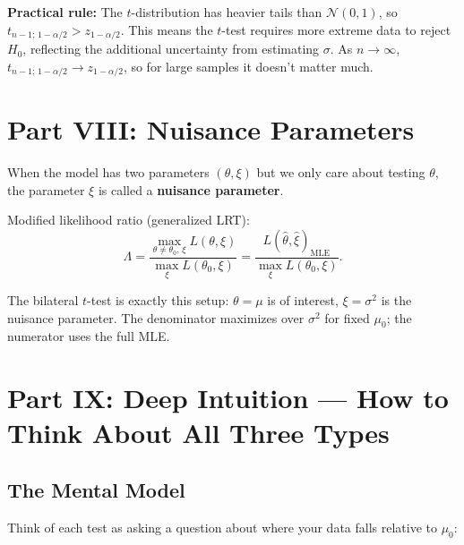 \documentclass[11pt,a4paper]{article}
\begin{document}
\begin{tcolorbox}[infobox]
\textbf{Practical rule:} The $t$-distribution has heavier tails than $\mathcal{N}(0,1)$, so $t_{n-1;\,1-\alpha/2} > z_{1-\alpha/2}$. This means the $t$-test requires more extreme data to reject $H_0$, reflecting the additional uncertainty from estimating $\sigma$. As $n\to\infty$, $t_{n-1;\,1-\alpha/2}\to z_{1-\alpha/2}$, so for large samples it doesn't matter much.
\end{tcolorbox}

\section{Part VIII: Nuisance Parameters}

\begin{tcolorbox}[defbox, title={Nuisance parameter setup (Lecture slide 31)}]
When the model has two parameters $(\theta,\xi)$ but we only care about testing $\theta$, the parameter $\xi$ is called a \textbf{nuisance parameter}.

Modified likelihood ratio (generalized LRT):
\[
  \Lambda = \frac{\max_{\theta\neq\theta_0,\,\xi} L(\theta,\xi)}{\max_\xi L(\theta_0,\xi)} = \frac{L(\hat\theta,\hat\xi)_{\text{MLE}}}{\max_\xi L(\theta_0,\xi)}.
\]
\end{tcolorbox}

The bilateral $t$-test is exactly this setup: $\theta=\mu$ is of interest, $\xi=\sigma^2$ is the nuisance parameter. The denominator maximizes over $\sigma^2$ for fixed $\mu_0$; the numerator uses the full MLE.

\section{Part IX: Deep Intuition --- How to Think About All Three Types}

\subsection{The Mental Model}

Think of each test as asking a question about where your data falls relative to $\mu_0$:
\end{document}
